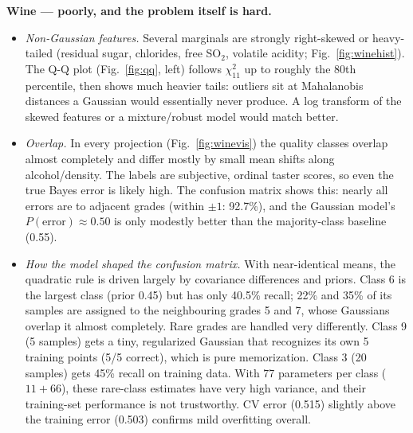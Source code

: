 \documentclass[10pt]{article}
\begin{document}
\textbf{Wine --- poorly, and the problem itself is hard.}
\begin{itemize}
\item \emph{Non-Gaussian features.} Several marginals are strongly right-skewed or heavy-tailed (residual sugar, chlorides, free SO$_2$, volatile acidity; Fig.~\ref{fig:winehist}). The Q-Q plot (Fig.~\ref{fig:qq}, left) follows $\chi^2_{11}$ up to roughly the 80th percentile, then shows much heavier tails: outliers sit at Mahalanobis distances a Gaussian would essentially never produce. A log transform of the skewed features or a mixture/robust model would match better.
\item \emph{Overlap.} In every projection (Fig.~\ref{fig:winevis}) the quality classes overlap almost completely and differ mostly by small mean shifts along alcohol/density. The labels are subjective, ordinal taster scores, so even the true Bayes error is likely high. The confusion matrix shows this: nearly all errors are to adjacent grades (within $\pm1$: 92.7\%), and the Gaussian model's $P(\text{error})\approx0.50$ is only modestly better than the majority-class baseline (0.55).
\item \emph{How the model shaped the confusion matrix.} With near-identical means, the quadratic rule is driven largely by covariance differences and priors. Class 6 is the largest class (prior 0.45) but has only 40.5\% recall; 22\% and 35\% of its samples are assigned to the neighbouring grades 5 and 7, whose Gaussians overlap it almost completely. Rare grades are handled very differently. Class 9 (5 samples) gets a tiny, regularized Gaussian that recognizes its own 5 training points (5/5 correct), which is pure memorization. Class 3 (20 samples) gets 45\% recall on training data. With 77 parameters per class ($11+66$), these rare-class estimates have very high variance, and their training-set performance is not trustworthy. CV error (0.515) slightly above the training error (0.503) confirms mild overfitting overall.
\end{itemize}
\end{document}
